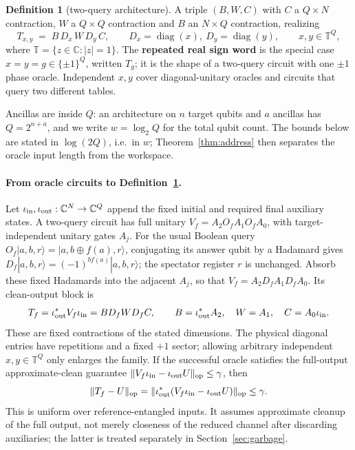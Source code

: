 \documentclass[11pt,a4paper]{article}
\theoremstyle{plain}
\theoremstyle{definition}
\newtheorem{definition}[theorem]{Definition}
\theoremstyle{remark}
\DeclareMathOperator{\diag}{diag}
\DeclareMathOperator{\op}{op}
\newcommand{\T}{\mathbb T}
\newcommand{\C}{\mathbb C}
\begin{document}
\begin{definition}[two-query architecture]\label{def:arch}
A triple $(B,W,C)$ with $C$ a $Q\times N$ contraction, $W$ a $Q\times Q$ contraction and $B$
an $N\times Q$ contraction, realizing
\[
T_{x,y}\;=\;B\,D_x\,W\,D_y\,C,\qquad D_x=\diag(x),\ D_y=\diag(y),\qquad x,y\in\T^Q,
\]
where $\T=\{z\in\C:|z|=1\}$. The \textbf{repeated real sign word} is the special case
$x=y=g\in\{\pm1\}^Q$, written $T_g$; it is the shape of a two-query circuit with one $\pm1$
phase oracle. Independent $x,y$ cover diagonal-unitary oracles and circuits that query two
different tables.
\end{definition}

Ancillas are inside $Q$: an architecture on $n$ target qubits and $a$ ancillas has
$Q=2^{n+a}$, and we write $w=\log_2Q$ for the total qubit count. The bounds below are stated
in $\log(2Q)$, i.e.\ in $w$; Theorem~\ref{thm:address} then separates the oracle input length
from the workspace.

\paragraph{From oracle circuits to Definition~\ref{def:arch}.}
Let $\iota_{\rm in},\iota_{\rm out}:\C^N\to\C^Q$ append the fixed initial
and required final auxiliary states. A two-query circuit has full unitary
$V_f=A_2O_fA_1O_fA_0$, with target-independent unitary gates $A_j$.
For the usual Boolean query $O_f|a,b,r\rangle=|a,b\oplus f(a),r\rangle$,
conjugating its answer qubit by a Hadamard gives
$D_f|a,b,r\rangle=(-1)^{bf(a)}|a,b,r\rangle$; the spectator register $r$
is unchanged. Absorb these fixed Hadamards into the adjacent $A_j$, so that
$V_f=A_2D_fA_1D_fA_0$. Its clean-output block is
\[
 T_f=\iota_{\rm out}^*V_f\iota_{\rm in}
     =B D_f W D_f C,\qquad
 B=\iota_{\rm out}^*A_2,\quad W=A_1,\quad C=A_0\iota_{\rm in}.
\]
These are fixed contractions of the stated dimensions. The physical diagonal
entries have repetitions and a fixed $+1$ sector; allowing arbitrary independent
$x,y\in\T^Q$ only enlarges the family. If the successful oracle satisfies the
full-output approximate-clean guarantee
$\|V_f\iota_{\rm in}-\iota_{\rm out}U\|_{\op}\le\gamma$, then
\[
 \|T_f-U\|_{\op}
 =\|\iota_{\rm out}^*(V_f\iota_{\rm in}-\iota_{\rm out}U)\|_{\op}
 \le\gamma.
\]
This is uniform over reference-entangled inputs. It assumes approximate cleanup
of the full output, not merely closeness of the reduced channel after discarding
auxiliaries; the latter is treated separately in Section~\ref{sec:garbage}.
\end{document}

